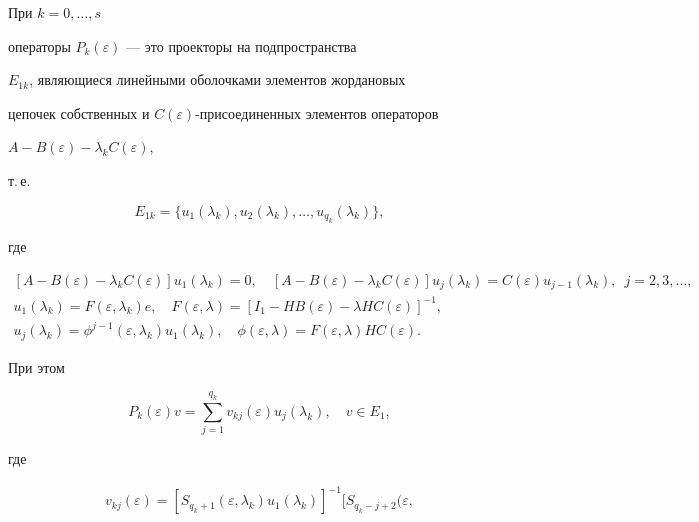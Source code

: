 \begin{thm}


При $k=0, \dotsc, s$


операторы $P_k( \varepsilon)$ --- это проекторы на подпространства


$E_{1k}$, являющиеся линейными оболочками элементов жордановых


цепочек собственных и $C(\varepsilon)$-присоединенных элементов операторов 


$A-B(\varepsilon)-\lambda_kC(\varepsilon)$,


т.\,е.


$$


E_{1k}=\{u_1(\lambda_k),u_2(\lambda_k),\dotsc,u_{q_k}(\lambda_k)\},


$$


где


\begin{gather*}


[A-B(\varepsilon)-\lambda_kC(\varepsilon)]u_1(\lambda_k)=0,\quad


[A-B(\varepsilon)-\lambda_kC(\varepsilon)]u_j(\lambda_k)=


C(\varepsilon)u_{j-1}(\lambda_k),\ \; j=2, 3,\dotsc,\\


%


u_1(\lambda_k)=F(\varepsilon,\lambda_k)e,\quad F(\varepsilon,


\lambda)=[I_1- HB(\varepsilon)-\lambda HC(\varepsilon)]^{-1},\\


%


u_j(\lambda_k)=\phi^{j-1}(\varepsilon,\lambda_k)u_1(\lambda_k), \quad


\phi(\varepsilon, \lambda)=F(\varepsilon,


\lambda)HC(\varepsilon).


\end{gather*}


При этом


$$


P_k(\varepsilon)v=\sum_{j=1}^{q_k}v_{kj}(\varepsilon)u_j(\lambda_k),


\quad v\in E_1,


$$


где


\begin{gather}


v_{kj}(\varepsilon)=[S_{q_k+1}(\varepsilon,\lambda_k)u_1(\lambda_k)]^{-1}[


S_{q_k-j+2}(\varepsilon, 



\end{gather}
\end{thm}
